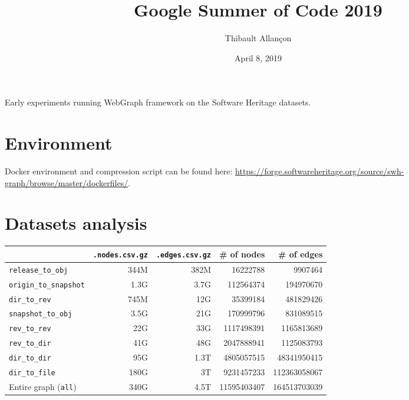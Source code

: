 \documentclass[11pt,a4paper]{article}
\title{Google Summer of Code 2019}
\author{Thibault Allançon}
\date{April 8, 2019}
\begin{document}
\maketitle

Early experiments running WebGraph framework on the Software Heritage datasets.

\section{Environment}

Docker environment and compression script can be found here:
\url{https://forge.softwareheritage.org/source/swh-graph/browse/master/dockerfiles/}.

\section{Datasets analysis}

\begin{center}
    \begin{tabular}{@{} l *4r @{}}
        \toprule
        \multicolumn{1}{c}{} &
            \textbf{\texttt{.nodes.csv.gz}} &
            \textbf{\texttt{.edges.csv.gz}} &
            \textbf{\# of nodes} & \textbf{\# of edges} \\
        \midrule
        \texttt{release\_to\_obj}
            & 344M & 382M & \num{16222788} & \num{9907464} \\
        \texttt{origin\_to\_snapshot}
            & 1.3G & 3.7G & \num{112564374} & \num{194970670} \\
        \texttt{dir\_to\_rev}
            & 745M & 12G & \num{35399184} & \num{481829426} \\
        \texttt{snapshot\_to\_obj}
            & 3.5G & 21G & \num{170999796} & \num{831089515} \\
        \texttt{rev\_to\_rev}
            & 22G & 33G & \num{1117498391} & \num{1165813689} \\
        \texttt{rev\_to\_dir}
            & 41G & 48G & \num{2047888941} & \num{1125083793} \\
        \texttt{dir\_to\_dir}
            & 95G & 1.3T & \num{4805057515} & \num{48341950415} \\
        \texttt{dir\_to\_file}
            & 180G & 3T & \num{9231457233} & \num{112363058067} \\
        \midrule
        Entire graph (\texttt{all})
            & 340G & 4.5T & \num{11595403407} & \num{164513703039} \\
        \bottomrule
    \end{tabular}
\end{center}
\end{document}
